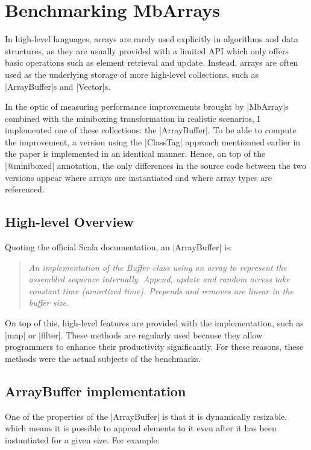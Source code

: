 \section{Benchmarking MbArrays}
\label{sec:bench}

In high-level languages, arrays are rarely used explicitly in algorithms and data structures, as they are usually provided with a limited API which only offers basic operations such as element retrieval and update. Instead, arrays are often used as the underlying storage of more high-level collections, such as |ArrayBuffer|s and |Vector|s.

In the optic of measuring performance improvements brought by |MbArray|s combined with the miniboxing transformation in realistic scenarios, I implemented one of these collections: the |ArrayBuffer|. To be able to compute the improvement, a version using the |ClassTag| approach mentionned earlier in the paper is implemented in an identical manner. Hence, on top of the |@miniboxed| annotation, the only differences in the source code between the two versions appear where arrays are instantiated and where array types are referenced. 

\subsection{High-level Overview}

Quoting the official Scala documentation, an |ArrayBuffer| is: 
\begin{quote}
\textit{An implementation of the Buffer class using an array to represent the assembled sequence internally. Append, update and random access take constant time (amortized time). Prepends and removes are linear in the buffer size.} 
\end{quote}

On top of this, high-level features are provided with the implementation, such as |map| or |filter|. These methods are regularly used because they allow programmers to enhance their productivity significantly. For these reasons, these methods were the actual subjects of the benchmarks.

\subsection{ArrayBuffer implementation}

One of the properties of the |ArrayBuffer| is that it is dynamically resizable, which means it is possible to append elements to it even after it has been instantiated for a given size. For example: 

